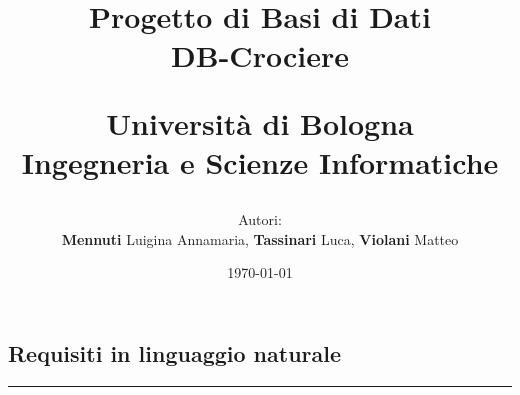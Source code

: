 \documentclass[a4paper, titlepage]{report}
\begin{document}
	

\title{\textbf{Progetto di Basi di Dati} \\
	\vspace{1.5cm}
	\huge\textbf{ DB-Crociere}\\
	\vspace{0.3cm}
	\author{Autori: \\ \textbf{Mennuti} Luigina Annamaria, \textbf{Tassinari} Luca, \textbf{Violani} Matteo} 
	\small Università di Bologna\\Ingegneria e Scienze Informatiche \\
	\vspace{0.3cm}
	\date{\today}
	}

\maketitle
\tableofcontents


\newpage
\noindent
\chapter*{}


\section*{Requisiti in linguaggio naturale}

	\noindent\rule{\textwidth}{0.4pt} \\
\end{document}
